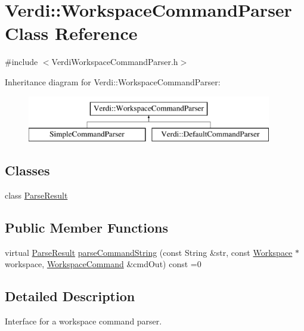 \hypertarget{class_verdi_1_1_workspace_command_parser}{\section{\-Verdi\-:\-:\-Workspace\-Command\-Parser \-Class \-Reference}
\label{class_verdi_1_1_workspace_command_parser}
}


{\ttfamily \#include $<$\-Verdi\-Workspace\-Command\-Parser.\-h$>$}

\-Inheritance diagram for \-Verdi\-:\-:\-Workspace\-Command\-Parser\-:\begin{figure}[H]
\begin{center}
\leavevmode
\includegraphics[height=2.000000cm]{class_verdi_1_1_workspace_command_parser}
\end{center}
\end{figure}
\subsection*{\-Classes}
\begin{DoxyCompactItemize}
\item 
class \hyperlink{class_verdi_1_1_workspace_command_parser_1_1_parse_result}{\-Parse\-Result}
\end{DoxyCompactItemize}
\subsection*{\-Public \-Member \-Functions}
\begin{DoxyCompactItemize}
\item 
virtual \hyperlink{class_verdi_1_1_workspace_command_parser_1_1_parse_result}{\-Parse\-Result} \hyperlink{class_verdi_1_1_workspace_command_parser_ae1e70534b68eeff3dd1edb58cae86799}{parse\-Command\-String} (const \-String \&str, const \hyperlink{class_verdi_1_1_workspace}{\-Workspace} $\ast$workspace, \hyperlink{class_verdi_1_1_workspace_command}{\-Workspace\-Command} \&cmd\-Out) const =0
\end{DoxyCompactItemize}


\subsection{\-Detailed \-Description}
\-Interface for a workspace command parser. 

